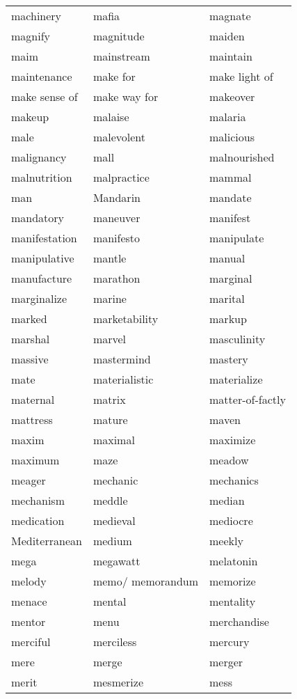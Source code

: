 \documentclass{minimal}
\begin{document}
\begin{longtable}{p{2.7cm}@{\hskip 0.2cm}p{2.7cm}@{\hskip 0.2cm}p{2.7cm}}
machinery & mafia & magnate \\
magnify & magnitude & maiden \\
maim & mainstream & maintain \\
maintenance & make for & make light of \\
make sense of & make way for & makeover \\
makeup & malaise & malaria \\
male & malevolent & malicious \\
malignancy & mall & malnourished \\
malnutrition & malpractice & mammal \\
man & Mandarin & mandate \\
mandatory & maneuver & manifest \\
manifestation & manifesto & manipulate \\
manipulative & mantle & manual \\
manufacture & marathon & marginal \\
marginalize & marine & marital \\
marked & marketability & markup \\
marshal & marvel & masculinity \\
massive & mastermind & mastery \\
mate & materialistic & materialize \\
maternal & matrix & matter-of-factly \\
mattress & mature & maven \\
maxim & maximal & maximize \\
maximum & maze & meadow \\
meager & mechanic & mechanics \\
mechanism & meddle & median \\
medication & medieval & mediocre \\
Mediterranean & medium & meekly \\
mega & megawatt & melatonin \\
melody & memo/ memorandum & memorize \\
menace & mental & mentality \\
mentor & menu & merchandise \\
merciful & merciless & mercury \\
mere & merge & merger \\
merit & mesmerize & mess \\

\end{longtable}
\end{document}
